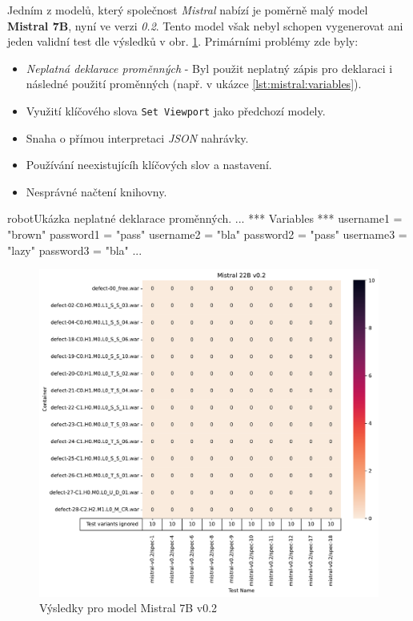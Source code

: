 \documentclass[czech, ma, kiv, he, iso690alph, pdf, viewonly]{fasthesis}
\begin{document}
        Jedním z modelů, který společnost \textit{Mistral} nabízí je poměrně malý model \textbf{Mistral 7B}, nyní ve verzi \textit{0.2}. Tento model však nebyl schopen vygenerovat ani jeden validní test dle výsledků v obr. \ref{fig:res:mistral-7b}. Primárními problémy zde byly:
        \begin{itemize}
            \item \emph{Neplatná deklarace proměnných} - Byl použit neplatný zápis pro deklaraci i následné použití proměnných (např. v ukázce \ref{lst:mistral:variables}).
            \item Využití klíčového slova \verb|Set Viewport| jako předchozí modely.
            \item Snaha o přímou interpretaci \textit{JSON} nahrávky.
            \item Používání neexistujícíh klíčových slov a nastavení.
            \item Nesprávné načtení knihovny.
        \end{itemize}

        \begin{code}{robot}{Ukázka neplatné deklarace proměnných. \label{lst:mistral:variables}}
...
*** Variables ***
username1 = "brown"
password1 = "pass"
username2 = "bla"
password2 = "pass"
username3 = "lazy"
password3 = "bla"
...
        \end{code}

        \begin{figure}
            \includegraphics[width=\textwidth]{pic/mistral-v0.2-res.pdf}
            \caption{Výsledky pro model Mistral 7B v0.2}
            \label{fig:res:mistral-7b}
        \end{figure}
\end{document}
